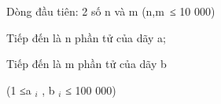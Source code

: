 Dòng đầu tiên: 2 số n và m (n,m ≤ 10 000)

Tiếp đến là n phần tử của dãy a;

Tiếp đến là m phần tử của dãy b

(1 ≤a $_ i $ , b $_ i $ ≤ 100 000)